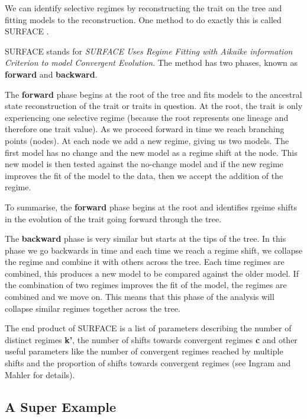\documentclass[
]{book}
\begin{document}
We can identify selective regimes by reconstructing the trait on the tree and fitting models to the reconstruction. One method to do exactly this is called SURFACE \citep{surface}.

SURFACE stands for \emph{SURFACE Uses Regime Fitting with Aikaike information Criterion to model Convergent Evolution}. The method has two phases, known as \textbf{forward} and \textbf{backward}.

The \textbf{forward} phase begins at the root of the tree and fits models to the ancestral state reconstruction of the trait or traits in question. At the root, the trait is only experiencing one selective regime (because the root represents one lineage and therefore one trait value). As we proceed forward in time we reach branching points (nodes). At each node we add a new regime, giving us two models. The first model has no change and the new model as a regime shift at the node. This new model is then tested against the no-change model and if the new regime improves the fit of the model to the data, then we accept the addition of the regime.

To summarise, the \textbf{forward} phase begins at the root and identifies rgeime shifts in the evolution of the trait going forward through the tree.

The \textbf{backward} phase is very similar but starts at the tips of the tree. In this phase we go backwards in time and each time we reach a regime shift, we collapse the regime and combine it with others across the tree. Each time regimes are combined, this produces a new model to be compared against the older model. If the combination of two regimes improves the fit of the model, the regimes are combined and we move on. This means that this phase of the analysis will collapse similar regimes together across the tree.

The end product of SURFACE is a list of parameters describing the number of distinct regimes \textbf{k'}, the number of shifts towards convergent regimes \textbf{c} and other useful parameters like the number of convergent regimes reached by multiple shifts and the proportion of shifts towards convergent regimes (see Ingram and Mahler \citeyearpar{surface} for details).

\hypertarget{a-super-example}{%
\subsection{A Super Example}\label{a-super-example}}
\end{document}
